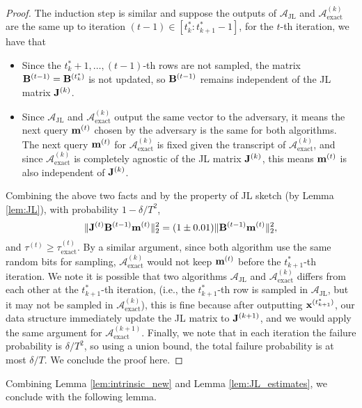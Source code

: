 \begin{proof}
The induction step is similar and suppose the outputs of $\mathcal{A}_{\text{JL}}$ and $\mathcal{A}_{\text{exact}}^{(k)}$ are the same up to iteration $(t-1) \in [t_k^{*}: t_{k+1}^{*}-1]$, for the $t$-th iteration, we have that
\begin{itemize}
\item Since the $t_{k}^{*} + 1, \ldots, (t-1)$-th rows are not sampled, the matrix $\mathbf{B}^{(t-1)} = \mathbf{B}^{(t^*_k)}$ is not updated, so $\mathbf{B}^{(t-1)}$ remains independent of the JL matrix $\mathbf{J}^{(k)}$.
\item Since $\mathcal{A}_{\text{JL}}$ and $\mathcal{A}_{\text{exact}}^{(k)}$ output the same vector to the adversary, it means the next query $\mathbf{m}^{(t)}$ chosen by the adversary is the same for both algorithms. The next query $\mathbf{m}^{(t)}$ for $\mathcal{A}_{\text{exact}}^{(k)}$ is fixed given the transcript of $\mathcal{A}_{\text{exact}}^{(k)}$, and since $\mathcal{A}_{\text{exact}}^{(k)}$ is completely agnostic of the JL matrix $\mathbf{J}^{(k)}$, this means $\mathbf{m}^{(t)}$ is also independent of $\mathbf{J}^{(k)}$. 
\end{itemize}
Combining the above two facts and by the property of JL sketch (by Lemma \ref{lem:JL}),  with probability $1 - \delta/T^2$, 
\[
 \|\mathbf{J}^{(t)} \mathbf{B}^{(t-1)} \mathbf{m}^{(t)}\|_2^2 = (1\pm 0.01) \|\mathbf{B}^{(t-1)} \mathbf{m}^{(t)}\|_2^2, 
\]
and $\tau^{(t)} \geq \tau^{(t)}_{\text{exact}}$. 
By a similar argument, since both algorithm use the same random bits for sampling, $\mathcal{A}_{\text{exact}}^{(k)}$ would not keep $\mathbf{m}^{(t)}$ before the $t_{k+1}^{*}$-th iteration. We note it is possible that two algorithms $\mathcal{A}_{\text{JL}}$ and $\mathcal{A}_{\text{exact}}^{(k)}$ differs from each other at the $t_{k+1}^{*}$-th iteration, (i.e., the $t^*_{k+1}$-th row is sampled in $\mathcal{A}_{\text{JL}}$, but it may not be sampled in $\mathcal{A}_{\text{exact}}^{(k)}$), this is fine because after outputting $\mathbf{x}^{(t^*_{k+1})}$, our data structure immediately update the JL matrix to $\mathbf{J}^{(k+1)}$, and we would apply the same argument for $\mathcal{A}_{\text{exact}}^{(k+1)}$. Finally, we note that in each iteration the failure probability is $\delta/T^2$, so using a union bound, the total failure probability is at most $\delta/T$. We conclude the proof here.
\end{proof}




Combining Lemma \ref{lem:intrinsic_new} and Lemma \ref{lem:JL_estimates}, we conclude with the following lemma.


